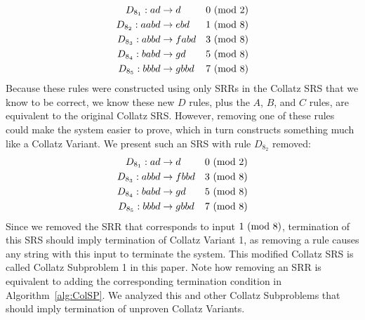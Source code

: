 \begin{align*}
    D_{8_1}: ad &\rightarrow d &\text{$0\ (\mathrm{mod}\ 2)$}\\
    D_{8_2}: aabd &\rightarrow ebd &\text{$1\ (\mathrm{mod}\ 8)$}\\
    D_{8_3}: abbd &\rightarrow fabd &\text{$3\ (\mathrm{mod}\ 8)$}\\
    D_{8_4}: babd &\rightarrow gd &\text{$5\ (\mathrm{mod}\ 8)$}\\
    D_{8_5}: bbbd &\rightarrow gbbd &\text{$7\ (\mathrm{mod}\ 8)$}
\end{align*}
Because these rules were constructed using only SRRs in the Collatz SRS that we know to be correct, we know these new $D$ rules, plus the $A$, $B$, and $C$ rules, are equivalent to the original Collatz SRS. However, removing one of these rules could make the system easier to prove, which in turn constructs something much like a Collatz Variant. We present such an SRS with rule $D_{8_2}$ removed:
\begin{align*}
    D_{8_1}: ad &\rightarrow d &\text{$0\ (\mathrm{mod}\ 2)$}\\
    D_{8_3}: abbd &\rightarrow fbbd &\text{$3\ (\mathrm{mod}\ 8)$}\\
    D_{8_4}: babd &\rightarrow gd &\text{$5\ (\mathrm{mod}\ 8)$}\\
    D_{8_5}: bbbd &\rightarrow gbbd &\text{$7\ (\mathrm{mod}\ 8)$}
\end{align*}
Since we removed the SRR that corresponds to input $1 \ (\mathrm{mod}\ 8)$, termination of this SRS should imply termination of Collatz Variant 1, as removing a rule causes any string with this input to terminate the system. This modified Collatz SRS is called Collatz Subproblem 1 in this paper. Note how removing an SRR is equivalent to adding the corresponding termination condition in Algorithm~\ref{alg:ColSP}.  We analyzed this and other Collatz Subproblems that should imply termination of unproven Collatz Variants.\par
